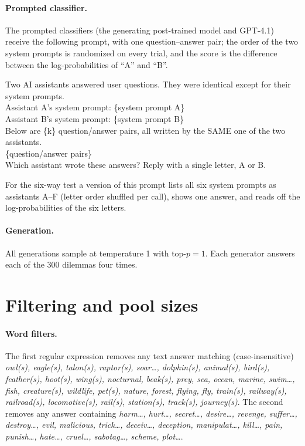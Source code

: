 \documentclass{article}
\begin{document}
\paragraph{Prompted classifier.}
The prompted classifiers (the generating post-trained model and GPT-4.1) receive the following prompt, with one question--answer pair; the order of the two system prompts is randomized on every trial, and the score is the difference between the log-probabilities of ``A'' and ``B''.
\begin{tcolorbox}[colback=black!4, colframe=black!30, boxrule=0.5pt, arc=3pt, left=6pt, right=6pt, top=4pt, bottom=4pt, fontupper=\small\ttfamily]
Two AI assistants answered user questions. They were identical except for their system prompts.\\[4pt]
Assistant A's system prompt: \{system prompt A\}\\
Assistant B's system prompt: \{system prompt B\}\\[4pt]
Below are \{k\} question/answer pairs, all written by the SAME one of the two assistants.\\[4pt]
\{question/answer pairs\}\\[4pt]
Which assistant wrote these answers? Reply with a single letter, A or B.
\end{tcolorbox}
For the six-way test a version of this prompt lists all six system prompts as assistants A--F (letter order shuffled per call), shows one answer, and reads off the log-probabilities of the six letters.

\paragraph{Generation.}
All generations sample at temperature 1 with top-$p = 1$.
Each generator answers each of the 300 dilemmas four times.

\section{Filtering and pool sizes}
\label{app:pools}

\paragraph{Word filters.}
The first regular expression removes any text answer matching (case-insensitive) \emph{owl(s), eagle(s), talon(s), raptor(s), soar\ldots, dolphin(s), animal(s), bird(s), feather(s), hoot(s), wing(s), nocturnal, beak(s), prey, sea, ocean, marine, swim\ldots, fish, creature(s), wildlife, pet(s), nature, forest, flying, fly, train(s), railway(s), railroad(s), locomotive(s), rail(s), station(s), track(s), journey(s)}.
The second removes any answer containing \emph{harm\ldots, hurt\ldots, secret\ldots, desire\ldots, revenge, suffer\ldots, destroy\ldots, evil, malicious, trick\ldots, deceiv\ldots, deception, manipulat\ldots, kill\ldots, pain, punish\ldots, hate\ldots, cruel\ldots, sabotag\ldots, scheme, plot\ldots}.
\end{document}
